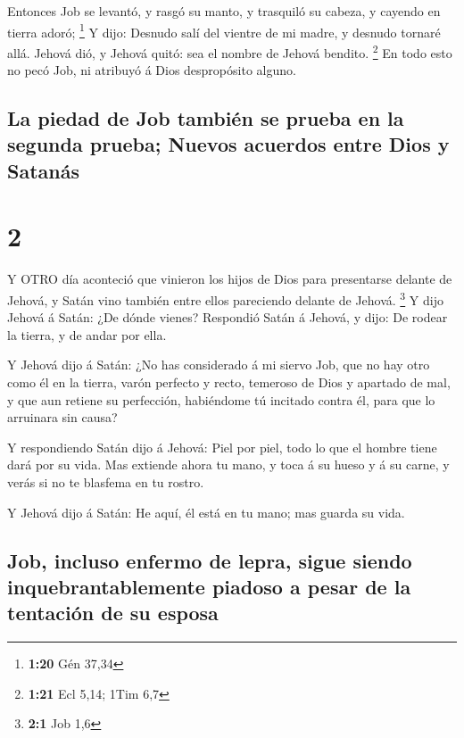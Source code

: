  Entonces Job se levantó, y rasgó su manto, y trasquiló su
cabeza, y cayendo en tierra adoró; \footnote{\textbf{1:20} Gén 37,34}
 Y dijo: Desnudo salí del vientre de mi madre, y desnudo
tornaré allá. Jehová dió, y Jehová quitó: sea el nombre de Jehová
bendito. \footnote{\textbf{1:21} Ecl 5,14; 1Tim 6,7}  En
todo esto no pecó Job, ni atribuyó á Dios despropósito alguno.

\hypertarget{la-piedad-de-job-tambiuxe9n-se-prueba-en-la-segunda-prueba-nuevos-acuerdos-entre-dios-y-satanuxe1s}{%
\subsection{La piedad de Job también se prueba en la segunda prueba;
Nuevos acuerdos entre Dios y
Satanás}\label{la-piedad-de-job-tambiuxe9n-se-prueba-en-la-segunda-prueba-nuevos-acuerdos-entre-dios-y-satanuxe1s}}

\hypertarget{section-1}{%
\section{2}\label{section-1}}

 Y OTRO día aconteció que vinieron los hijos de Dios para
presentarse delante de Jehová, y Satán vino también entre ellos
pareciendo delante de Jehová. \footnote{\textbf{2:1} Job 1,6}
 Y dijo Jehová á Satán: ¿De dónde vienes? Respondió Satán á
Jehová, y dijo: De rodear la tierra, y de andar por ella.

 Y Jehová dijo á Satán: ¿No has considerado á mi siervo Job,
que no hay otro como él en la tierra, varón perfecto y recto, temeroso
de Dios y apartado de mal, y que aun retiene su perfección, habiéndome
tú incitado contra él, para que lo arruinara sin causa?

 Y respondiendo Satán dijo á Jehová: Piel por piel, todo lo
que el hombre tiene dará por su vida.  Mas extiende ahora tu
mano, y toca á su hueso y á su carne, y verás si no te blasfema en tu
rostro.

 Y Jehová dijo á Satán: He aquí, él está en tu mano; mas
guarda su vida.

\hypertarget{job-incluso-enfermo-de-lepra-sigue-siendo-inquebrantablemente-piadoso-a-pesar-de-la-tentaciuxf3n-de-su-esposa}{%
\subsection{Job, incluso enfermo de lepra, sigue siendo
inquebrantablemente piadoso a pesar de la tentación de su
esposa}\label{job-incluso-enfermo-de-lepra-sigue-siendo-inquebrantablemente-piadoso-a-pesar-de-la-tentaciuxf3n-de-su-esposa}}

